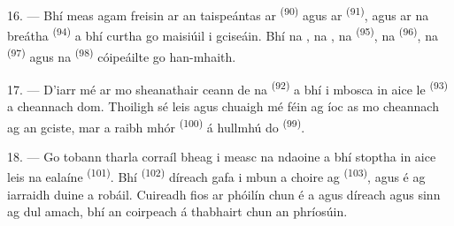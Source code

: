 16. --- Bhí meas agam freisin ar an taispeántas ar 
\textsuperscript{(90)} agus ar  \textsuperscript{(91)}, agus ar
na  breátha \textsuperscript{(94)} a bhí curtha go
maisiúil i gciseáin. Bhí na , na , na
 \textsuperscript{(95)}, na  \textsuperscript{(96)},
na  \textsuperscript{(97)} agus na 
\textsuperscript{(98)} cóipeáilte go han-mhaith.

\VUsaut{4.4mm}
\VUsaut{2.8mm}

17. --- D'iarr mé ar mo sheanathair ceann de na 
\textsuperscript{(92)} a bhí i mbosca in aice le 
\textsuperscript{(93)} a cheannach dom. Thoiligh sé leis agus chuaigh mé féin ag íoc
as mo cheannach ag an gciste, mar a raibh  mhór
\textsuperscript{(100)} á hullmhú do  \textsuperscript{(99)}.

18. --- Go tobann tharla corraíl bheag i measc na ndaoine a bhí stoptha in aice leis
na  ealaíne \textsuperscript{(101)}. Bhí 
\textsuperscript{(102)} díreach gafa i mbun a choire ag 
\textsuperscript{(103)}, agus é ag iarraidh duine a robáil. Cuireadh fios ar phóilín
chun é a  agus díreach agus sinn ag dul amach, bhí an coirpeach á
thabhairt chun an phríosúin.
